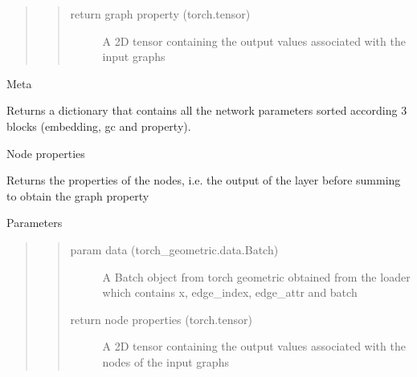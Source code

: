 \documentclass[letterpaper,10pt,english]{sphinxmanual}
\begin{document}
\begin{fulllineitems}
\begin{fulllineitems}
\begin{quote}
\begin{quote}
\begin{description}
\item[{return graph property (torch.tensor)}] \leavevmode
A 2D tensor containing the output values associated with the input graphs

\end{description}\end{quote}
\end{quote}

\end{fulllineitems}


\begin{fulllineitems}
\label{\detokenize{modules/gqcml.torchgeom_interface:gqcml.torchgeom_interface.models_3.GatedGraphConv.meta}}
Meta

Returns a dictionary that contains all the network parameters sorted according 3
blocks (embedding, gc and property).

\end{fulllineitems}


\begin{fulllineitems}
\label{\detokenize{modules/gqcml.torchgeom_interface:gqcml.torchgeom_interface.models_3.GatedGraphConv.node_properties}}
Node properties

Returns the properties of the nodes, i.e. the output of the layer before summing to obtain the
graph property

Parameters
\begin{quote}
\begin{quote}\begin{description}
\item[{param data (torch\_geometric.data.Batch)}] \leavevmode
A Batch object from torch geometric obtained from the loader
which contains x, edge\_index, edge\_attr and batch

\item[{return node properties (torch.tensor)}] \leavevmode
A 2D tensor containing the output values associated with the
nodes of the input graphs

\end{description}\end{quote}
\end{quote}

\end{fulllineitems}


\end{fulllineitems}
\end{document}

